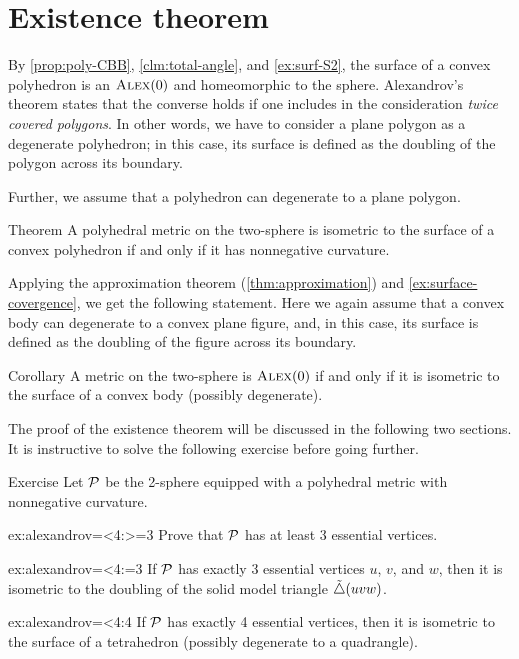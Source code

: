 \section{Existence theorem}

By \ref{prop:poly-CBB}, \ref{clm:total-angle}, and \ref{ex:surf-S2}, the surface of a convex polyhedron is an $\textsc{Alex}(0)$ and homeomorphic to the sphere.
Alexandrov's theorem states that the converse holds if one includes in the consideration \textit{twice covered polygons}.
In other words, we have to consider a plane polygon as a degenerate polyhedron;
in this case, its surface is defined as the doubling of the polygon across its boundary.

Further, we assume that a polyhedron can degenerate to a plane polygon.

\begin{thm}{Theorem}\label{thm:alexandrov-first}
A polyhedral metric on the two-sphere is isometric to the surface of a convex polyhedron if and only if it has nonnegative curvature.

\end{thm}

Applying the approximation theorem (\ref{thm:approximation}) and \ref{ex:surface-covergence}, we get the following statement.
Here we again assume that a convex body can degenerate to a convex plane figure,
and, in this case, its surface is defined as the doubling of the figure across its boundary.

\begin{thm}{Corollary}\label{cor:Alex0-convex}
A metric on the two-sphere is $\textsc{Alex}(0)$ if and only if it is isometric to the surface of a convex body (possibly degenerate).

\end{thm}

The proof of the existence theorem will be discussed in the following two sections.
It is instructive to solve the following exercise before going further.

\begin{thm}{Exercise}\label{ex:alexandrov=<4}
Let $\mathcal{P}$ be the 2-sphere equipped with a polyhedral metric with nonnegative curvature.

\begin{subthm}{ex:alexandrov=<4:>=3}
Prove that $\mathcal{P}$ has at least 3 essential vertices.
\end{subthm}

\begin{subthm}{ex:alexandrov=<4:=3}
If $\mathcal{P}$ has exactly 3 essential vertices $u$, $v$, and $w$, then it is isometric to the doubling of the solid model triangle $\tilde\triangle(uvw)$.
\end{subthm}

\begin{subthm}{ex:alexandrov=<4:4}
If $\mathcal{P}$ has exactly 4 essential vertices, then it is isometric to the surface of a tetrahedron (possibly degenerate to a quadrangle).
\end{subthm}

\end{thm}

